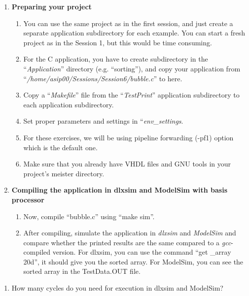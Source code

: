 \documentclass[
]{article}
\begin{document}
\begin{enumerate}
\def\labelenumi{\arabic{enumi}.}
\setcounter{enumi}{1}
\item
  \textbf{Preparing your project}

  \begin{enumerate}
  \def\labelenumii{\arabic{enumii}.}
  \item
    You can use the same project as in the first session, and just
    create a separate application subdirectory for each example. You can
    start a fresh project as in the Session 1, but this would be time
    consuming.
  \item
    For the C application, you have to create subdirectory in the
    ``\emph{Application}'' directory (e.g. ``sorting''), and copy your
    application from ``\emph{/home/asip00/Sessions/Session6/bubble.c}''
    to here.
  \item
    Copy a ``\emph{Makefile}'' file from the ``\emph{TestPrint}''
    application subdirectory to each application subdirectory.
  \item
    Set proper parameters and settings in ``\emph{env\_settings}.
  \item
    For these exercises, we will be using pipeline forwarding (-pf1)
    option which is the default one.
  \item
    Make sure that you already have VHDL files and GNU tools in your
    project's meister directory.
  \end{enumerate}
\item
  \textbf{Compiling the application in dlxsim and ModelSim with basis
  processor}

  \begin{enumerate}
  \def\labelenumii{\arabic{enumii}.}
  \item
    Now, compile ``bubble.c'' using ``make sim''.
  \item
    After compiling, simulate the application in \emph{dlxsim} and
    \emph{ModelSim} and compare whether the printed results are the same
    compared to a \emph{gcc}-compiled version. For dlxsim, you can use
    the command ``get \_array 20d'', it should give you the sorted
    array. For ModelSim, you can see the sorted array in the
    TestData.OUT file.
  \end{enumerate}
\end{enumerate}

\begin{enumerate}
\def\labelenumi{\alph{enumi})}
\item
  How many cycles do you need for execution in dlxsim and ModelSim?
\end{enumerate}
\end{document}
